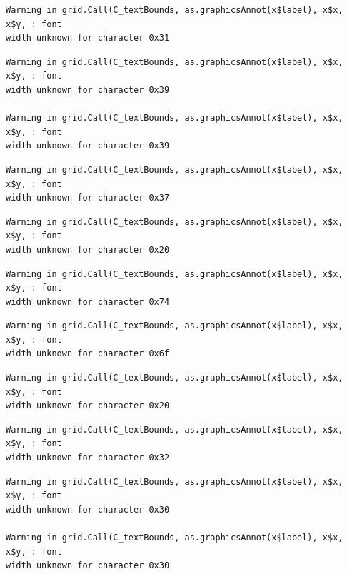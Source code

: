 \documentclass[
  letterpaper,
  DIV=11,
  numbers=noendperiod]{scrreprt}
\begin{document}
\begin{verbatim}
Warning in grid.Call(C_textBounds, as.graphicsAnnot(x$label), x$x, x$y, : font
width unknown for character 0x31
\end{verbatim}

\begin{verbatim}
Warning in grid.Call(C_textBounds, as.graphicsAnnot(x$label), x$x, x$y, : font
width unknown for character 0x39

Warning in grid.Call(C_textBounds, as.graphicsAnnot(x$label), x$x, x$y, : font
width unknown for character 0x39
\end{verbatim}

\begin{verbatim}
Warning in grid.Call(C_textBounds, as.graphicsAnnot(x$label), x$x, x$y, : font
width unknown for character 0x37
\end{verbatim}

\begin{verbatim}
Warning in grid.Call(C_textBounds, as.graphicsAnnot(x$label), x$x, x$y, : font
width unknown for character 0x20
\end{verbatim}

\begin{verbatim}
Warning in grid.Call(C_textBounds, as.graphicsAnnot(x$label), x$x, x$y, : font
width unknown for character 0x74
\end{verbatim}

\begin{verbatim}
Warning in grid.Call(C_textBounds, as.graphicsAnnot(x$label), x$x, x$y, : font
width unknown for character 0x6f
\end{verbatim}

\begin{verbatim}
Warning in grid.Call(C_textBounds, as.graphicsAnnot(x$label), x$x, x$y, : font
width unknown for character 0x20
\end{verbatim}

\begin{verbatim}
Warning in grid.Call(C_textBounds, as.graphicsAnnot(x$label), x$x, x$y, : font
width unknown for character 0x32
\end{verbatim}

\begin{verbatim}
Warning in grid.Call(C_textBounds, as.graphicsAnnot(x$label), x$x, x$y, : font
width unknown for character 0x30

Warning in grid.Call(C_textBounds, as.graphicsAnnot(x$label), x$x, x$y, : font
width unknown for character 0x30
\end{verbatim}
\end{document}
